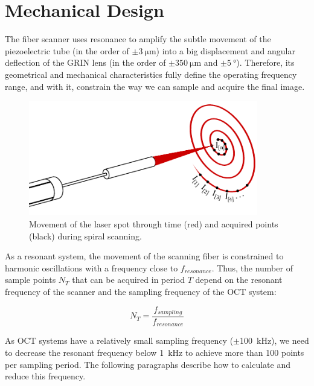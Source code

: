 
\section{Mechanical Design}
\label{sec:mechDesign}

The fiber scanner uses resonance to amplify the subtle movement of the piezoelectric tube (in the order of $\pm \SI{3}{\micro\meter}$) into a big displacement and angular deflection of the GRIN lens (in the order of $\pm \SI{350}{\micro\meter}$ and  $\pm \SI{5}{\degree}$). Therefore, its geometrical and mechanical characteristics fully define the operating frequency range, and with it, constrain the way we can sample and acquire the final image.

\begin{figure}[h!]\centering
      \includegraphics[width=10cm]{figures/30_DesignSimulation/Mechanical/spiralScanning.pdf}
      \caption{Movement of the laser spot through time (red) and acquired points (black) during spiral scanning.}
      \label{fig:spiralScanning}
\end{figure}

As a resonant system, the movement of the scanning fiber is constrained to harmonic oscillations with a frequency close to $f_{resonance}$. Thus, the number of sample points $N_{T}$ that can be acquired in period $T$ depend on the resonant frequency of the scanner and the sampling frequency of the OCT system:

\begin{equation}
N_{T} = \frac{f_{sampling}}{f_{resonance}}
\label{eq:nT}
\end{equation}

As OCT systems have a relatively small sampling frequency ($\pm$\SI{100}{\kilo\hertz}), we need to decrease the resonant frequency below \SI{1}{kHz} to achieve more than 100 points per sampling period. The following paragraphs describe how to calculate and reduce this frequency.

